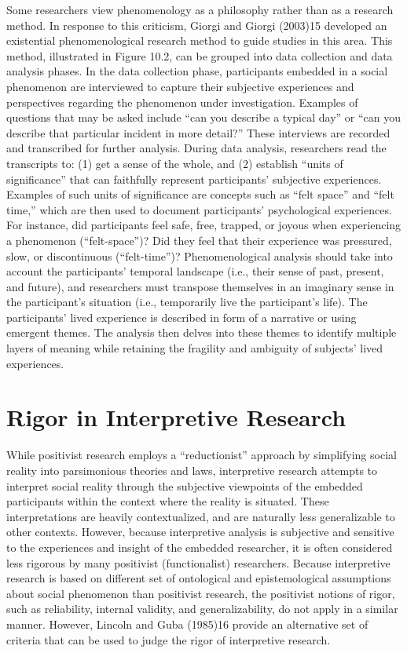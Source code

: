 Some researchers view phenomenology as a philosophy rather than as a research method. In response to this criticism, Giorgi and Giorgi (2003)15 developed an existential phenomenological research method to guide studies in this area. This method, illustrated in Figure 10.2, can be grouped into data collection and data analysis phases. In the data collection phase, participants embedded in a social phenomenon are interviewed to capture their subjective experiences and perspectives regarding the phenomenon under investigation. Examples of questions that may be asked include ``can you describe a typical day'' or ``can you describe that particular incident in more detail?'' These interviews are recorded and transcribed for further analysis. During data analysis, researchers read the transcripts to: (1) get a sense of the whole, and (2) establish ``units of significance'' that can faithfully represent participants' subjective experiences. Examples of such units of significance are concepts such as ``felt space'' and ``felt time,'' which are then used to document participants' psychological experiences. For instance, did participants feel safe, free, trapped, or joyous when experiencing a phenomenon (``felt-space'')? Did they feel that their experience was pressured, slow, or discontinuous (``felt-time'')? Phenomenological analysis should take into account the participants' temporal landscape (i.e., their sense of past, present, and future), and researchers must transpose themselves in an imaginary sense in the participant's situation (i.e., temporarily live the participant's life). The participants' lived experience is described in form of a narrative or using emergent themes. The analysis then delves into these themes to identify multiple layers of meaning while retaining the fragility and ambiguity of subjects' lived experiences.

\section{Rigor in Interpretive Research}

While positivist research employs a ``reductionist'' approach by simplifying social reality into parsimonious theories and laws, interpretive research attempts to interpret social reality through the subjective viewpoints of the embedded participants within the context where the reality is situated. These interpretations are heavily contextualized, and are naturally less generalizable to other contexts. However, because interpretive analysis is subjective and sensitive to the experiences and insight of the embedded researcher, it is often considered less rigorous by many positivist (functionalist) researchers. Because interpretive research is based on different set of ontological and epistemological assumptions about social phenomenon than positivist research, the positivist notions of rigor, such as reliability, internal validity, and generalizability, do not apply in a similar manner. However, Lincoln and Guba (1985)16 provide an alternative set of criteria that can be used to judge the rigor of interpretive research.

